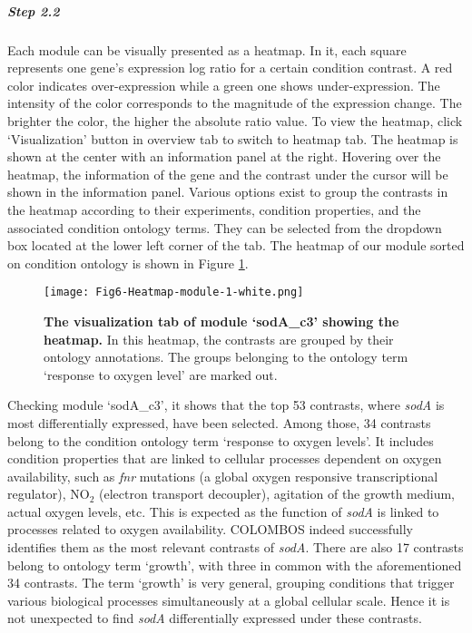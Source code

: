 \begin{small}
\subparagraph{Step 2.2}	Each module can be visually presented as a heatmap. 
In it, each square represents one gene's expression log ratio for a certain
condition contrast. A red color indicates over-expression while a green one
shows under-expression. The intensity of the color corresponds to the
magnitude of the expression change. The brighter the color, the higher the
absolute ratio value.
%
To view the heatmap, click `Visualization' button in overview tab to switch to
heatmap tab.  The heatmap is shown at the center with an information panel at
the right. Hovering over the heatmap, the information of the gene and the
contrast under the cursor will be shown in the information panel. Various
options exist to group the contrasts in the heatmap according to their
experiments, condition properties, and the associated condition ontology
terms. They can be selected from the dropdown box located at the lower left
corner of the tab. The heatmap of our module sorted on condition ontology is
shown in Figure \ref{fig:colombos-heatmap-m1}.
%
\begin{figure}[tb]
	\centering
  	\texttt{[image: Fig6-Heatmap-module-1-white.png]}
	\caption[Heatmap of module `sodA\_c3']{\textbf{The visualization tab of 
	module `sodA\_c3' showing the heatmap.}
	In this heatmap, the contrasts are grouped by their ontology annotations. 
	The groups belonging to the ontology term `response to oxygen 
	level' are marked out.}
	\label{fig:colombos-heatmap-m1}
\end{figure}

\end{small} %

Checking module `sodA\_c3', it shows that the top 53 contrasts, where
\textit{sodA} is most differentially expressed, have been selected. Among
those, 34 contrasts belong to the condition ontology term `response to oxygen
levels'.  It includes condition properties that are linked to cellular
processes dependent on oxygen availability, such as \textit{fnr} mutations (a
global oxygen responsive transcriptional regulator), NO$_2$ (electron
transport decoupler), agitation of the growth medium, actual oxygen levels,
etc. This is expected as the function of \textit{sodA} is linked to 
processes related to oxygen availability.
COLOMBOS indeed successfully identifies them as the most relevant contrasts of
\textit{sodA}. 
%
There are also 17 contrasts belong to ontology term `growth', with three in
common with the aforementioned 34 contrasts. The term `growth' is very
general, grouping conditions that trigger various biological processes
simultaneously at a global cellular scale. Hence it is not unexpected to find
\textit{sodA} differentially expressed under these contrasts.




